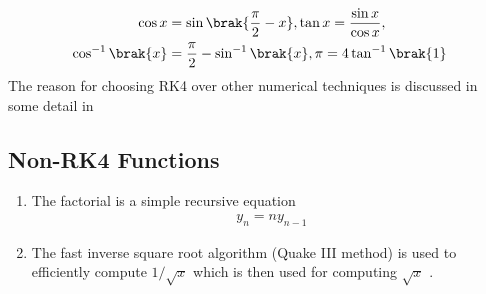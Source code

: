 \documentclass[conference]{IEEEtran}
\begin{document}
\begin{align}
\begin{split}
	\cos x &= \sin\brak{\frac{\pi}{2} - x},
	\tan x = \frac{\sin x }{\cos x},
	\\
	\cos^{-1}\brak{x} &= \frac{\pi}{2} - \sin^{-1}\brak{x},
	\pi =4\tan^{-1}\brak{1}
\end{split}
\end{align}
%
The reason for choosing RK4 over other numerical techniques is discussed in some detail in 
\subsection{Non-RK4 Functions}
\begin{enumerate}
	\item The factorial 
is a simple recursive equation
\cite{GVVSharma}
\begin{align}
y_n = n y_{n-1}
\end{align}

\item 
	The fast inverse square root algorithm (Quake III method) is used to efficiently compute $1/\sqrt{x}$ which is then used for computing $\sqrt{x}$ \cite{lomont2003}. 
%
\end{enumerate}

\end{document}
